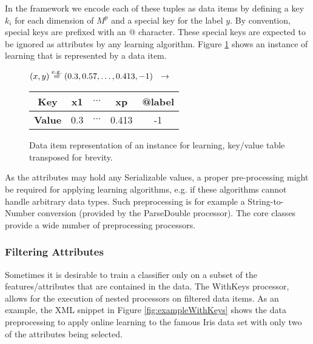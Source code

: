 In the \streams framework we encode each of these tuples as data
items by defining a key $k_i$ for each dimension of $M^p$ and a
special key for the label $y$. By convention, special keys are
prefixed with an {\ttfamily @} character. These special keys are
expected to be ignored as attributes by any learning algorithm.
Figure \ref{fig:exampleItem} shows an instance of learning that
is represented by a data item.

\begin{figure}[h!]
  \centering
$(x,y) \stackrel{\mbox{\scriptsize e.g.}}{=} (0.3,0.57,\ldots,0.413,-1) \ \ \rightarrow\ \  $ {\footnotesize \begin{tabular}{c|c|c|c|c}
{\bf \textsf{Key}} & {\ttfamily x1} & $\cdots$ & {\ttfamily xp} & {\ttfamily @label} \\ \hline
{\bf \textsf{Value}} & 0.3 & $\cdots$ & 0.413 & -1
\end{tabular}}
  \caption{\label{fig:exampleItem}Data item representation of an instance for learning, key/value table transposed for brevity.}
\end{figure}

As the attributes may hold any {\ttfamily Serializable} values, a
proper pre-processing might be required for applying learning
algorithms, e.g. if these algorithms cannot handle arbitrary data
types. Such preprocessing is for example a String-to-Number conversion
(provided by the {\ttfamily ParseDouble} processor). The \streams
core classes provide a wide number of preprocessing processors.

\subsubsection*{Filtering Attributes}
Sometimes it is desirable to train a classifier only on a subset of
the features/attributes that are contained in the data. The {\ttfamily WithKeys}
processor, allows for the execution of nested processors on filtered
data items. As an example, the XML snippet in Figure \ref{fig:exampleWithKeys}
shows the data preprocessing to apply online learning to the famous Iris
data set with only two of the attributes being selected.

